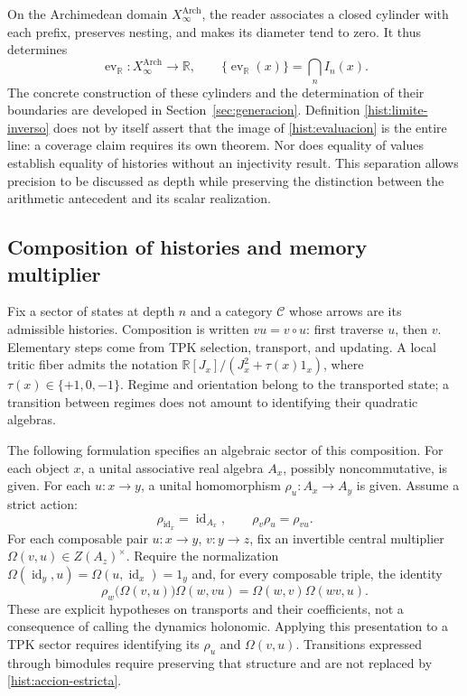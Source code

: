 On the Archimedean domain \(X_\infty^{\mathrm{Arch}}\), the reader
associates a closed cylinder with each prefix, preserves nesting, and
makes its diameter tend to zero. It thus determines
\begin{equation}
 \operatorname{ev}_{\mathbb R}:X_\infty^{\mathrm{Arch}}\longrightarrow
 \mathbb R,\qquad
 \{\operatorname{ev}_{\mathbb R}(x)\}=\bigcap_n I_n(x).
 \label{hist:evaluacion}
\end{equation}
The concrete construction of these cylinders and the determination of
their boundaries are developed in Section~\ref{sec:generacion}.
Definition \eqref{hist:limite-inverso} does not by itself assert
that the image of \eqref{hist:evaluacion} is the entire line:
a coverage claim requires its own theorem. Nor does equality of
values establish equality of histories without an injectivity result.
This separation allows precision to be discussed as depth while preserving
the distinction between the arithmetic antecedent and its scalar realization.

\subsection{Composition of histories and memory multiplier}
\label{hist:algebra}

Fix a sector of states at depth \(n\) and a category \(\mathcal C\)
whose arrows are its admissible histories. Composition is written
\(vu=v\circ u\): first traverse \(u\), then \(v\).
Elementary steps come from TPK selection, transport, and updating.
A local tritic fiber admits the notation
\(\mathbb R[J_x]/(J_x^2+\tau(x)1_x)\), where
\(\tau(x)\in\{+1,0,-1\}\). Regime and orientation belong to
the transported state; a transition between regimes does not amount
to identifying their quadratic algebras.

The following formulation specifies an algebraic sector of this composition.
For each object \(x\), a unital associative real algebra \(A_x\),
possibly noncommutative, is given. For each \(u:x\to y\), a
unital homomorphism \(\rho_u:A_x\to A_y\) is given. Assume a strict action:
\begin{equation}
 \rho_{\operatorname{id}_x}=\operatorname{id}_{A_x},\qquad
 \rho_v\rho_u=\rho_{vu}.
 \label{hist:accion-estricta}
\end{equation}
For each composable pair \(u:x\to y\), \(v:y\to z\), fix an
invertible central multiplier \(\Omega(v,u)\in Z(A_z)^\times\).
Require the normalization
\(\Omega(\operatorname{id}_y,u)=\Omega(u,\operatorname{id}_x)=1_y\)
and, for every composable triple, the identity
\begin{equation}
 \rho_w\bigl(\Omega(v,u)\bigr)\Omega(w,vu)
   =\Omega(w,v)\Omega(wv,u).
 \label{hist:cociclo}
\end{equation}
These are explicit hypotheses on transports and their coefficients,
not a consequence of calling the dynamics holonomic. Applying this
presentation to a TPK sector requires identifying its \(\rho_u\)
and \(\Omega(v,u)\). Transitions expressed through bimodules require
preserving that structure and are not replaced by \eqref{hist:accion-estricta}.

